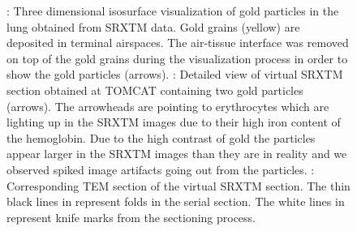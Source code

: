 \begin{figure}[htb]
\caption{: Three dimensional isosurface visualization of gold particles in the lung obtained from SRXTM data. Gold grains (yellow) are deposited in terminal airspaces. The air-tissue interface was removed on top of the gold grains during the visualization process in order to show the gold particles (arrows). : Detailed view of virtual SRXTM section obtained at TOMCAT containing two gold particles (arrows). The arrowheads are pointing to erythrocytes which are lighting up in the SRXTM images due to their high iron content of the hemoglobin. Due to the high contrast of gold the particles appear larger in the SRXTM images than they are in reality and we observed spiked image artifacts going out from the particles. : Corresponding TEM section of the virtual SRXTM section. %
The thin black lines in  represent folds in the serial section. The white lines in  represent knife marks from the sectioning process.}
\label{fig:imaris}
\end{figure}

